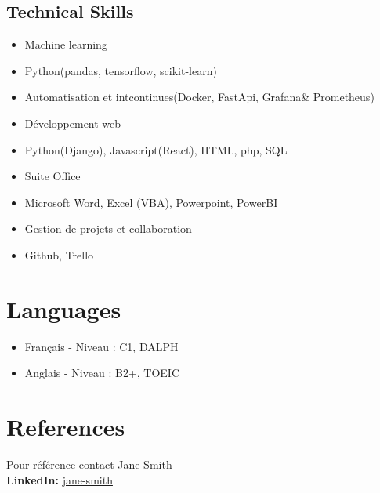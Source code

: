 \documentclass[a4paper,10pt]{article}
\begin{document}
\begin{multicols}{2}
\section*{ Technical Skills}
\begin{center}
    \begin{itemize}[label=, itemsep=-3pt]
        \item Machine learning
        \item Python(pandas, tensorflow, scikit-learn)
        \item Automatisation et int\ufffdgration continues(Docker, FastApi, Grafana\& Prometheus)
        
        \item Développement web
        \item Python(Django), Javascript(React), HTML, php, SQL
        
        \item Suite Office
        \item Microsoft Word, Excel (VBA), Powerpoint, PowerBI
        
        \item Gestion de projets et collaboration
        \item Github, Trello
    \end{itemize}
\end{center}
\end{multicols}

\section*{ Languages}
\begin{itemize}[label=]
    \item Français - Niveau : C1, DALPH
    \item Anglais - Niveau : B2+, TOEIC
\end{itemize}

\section*{ References}
Pour référence contact Jane Smith\\ \textbf{ LinkedIn:} \href{https://www.linkedin.com/in/jane-smith/}{jane-smith}
\end{document}
